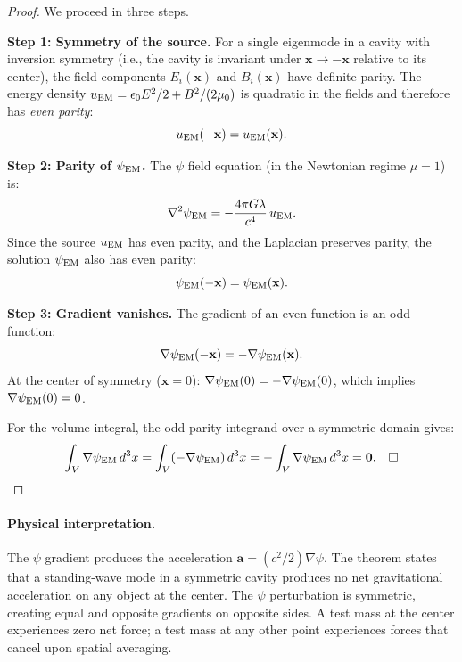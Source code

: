\documentclass[aps,prd,twocolumn,superscriptaddress,floatfix,nofootinbib]{revtex4-2}
\newcommand{\avec}{\mathbf{a}}
\newcommand{\mufunction}{\mu}
\newcommand{\lam}{\lambda}
\begin{document}
\begin{proof}
We proceed in three steps.

\textbf{Step 1: Symmetry of the source.}
For a single eigenmode in a cavity with inversion symmetry
(i.e., the cavity is invariant under $\mathbf{x} \to -\mathbf{x}$
relative to its center), the field components
$E_i(\mathbf{x})$ and $B_i(\mathbf{x})$ have definite parity.
The energy density $u_{\rm EM} = \epsilon_0 E^2/2 + B^2/(2\mu_0)$
is quadratic in the fields and therefore has \emph{even parity}:
\begin{equation}
u_{\rm EM}(-\mathbf{x}) = u_{\rm EM}(\mathbf{x}).
\label{eq:uEM-even}
\end{equation}

\textbf{Step 2: Parity of $\psi_{\rm EM}$.}
The $\psi$ field equation (in the Newtonian regime $\mufunction = 1$)
is:
\begin{equation}
\nabla^2\psi_{\rm EM} = -\frac{4\pi G\lam}{c^4}\,u_{\rm EM}.
\end{equation}
Since the source $u_{\rm EM}$ has even parity, and the Laplacian
preserves parity, the solution $\psi_{\rm EM}$ also has even parity:
\begin{equation}
\psi_{\rm EM}(-\mathbf{x}) = \psi_{\rm EM}(\mathbf{x}).
\end{equation}

\textbf{Step 3: Gradient vanishes.}
The gradient of an even function is an odd function:
\begin{equation}
\nabla\psi_{\rm EM}(-\mathbf{x})
= -\nabla\psi_{\rm EM}(\mathbf{x}).
\end{equation}
At the center of symmetry ($\mathbf{x} = 0$):
$\nabla\psi_{\rm EM}(0) = -\nabla\psi_{\rm EM}(0)$,
which implies $\nabla\psi_{\rm EM}(0) = 0$.

For the volume integral, the odd-parity integrand over a
symmetric domain gives:
\begin{equation}
\int_V\nabla\psi_{\rm EM}\,d^3x
= \int_V (-\nabla\psi_{\rm EM})\,d^3x
= -\int_V\nabla\psi_{\rm EM}\,d^3x = \mathbf{0}. \quad\square
\end{equation}
\end{proof}

\paragraph{Physical interpretation.}
The $\psi$ gradient produces the acceleration
$\avec = (c^2/2)\nabla\psi$. The theorem states that a standing-wave
mode in a symmetric cavity produces no net gravitational acceleration
on any object at the center. The $\psi$ perturbation is symmetric,
creating equal and opposite gradients on opposite sides. A test mass
at the center experiences zero net force; a test mass at any other
point experiences forces that cancel upon spatial averaging.
\end{document}
